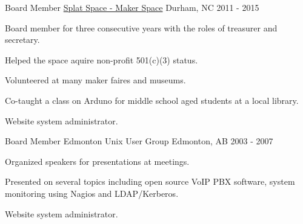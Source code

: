 

\begin{cventries}

  \cventry
    {Board Member} %
    {\href{http://splatspace.org/}{Splat Space - Maker Space}} %
    {Durham, NC} %
    {2011 - 2015} %
    {
      \begin{cvitems} %
        \item {Board member for three consecutive years with the roles of treasurer and secretary.}
        \item {Helped the space aquire non-profit 501(c)(3) status.}
        \item {Volunteered at many maker faires and museums.}
        \item {Co-taught a class on Arduno for middle school aged students at a local library.}
        \item {Website system administrator.}
      \end{cvitems}
    }

  \cventry
    {Board Member} %
    {Edmonton Unix User Group} %
    {Edmonton, AB} %
    {2003 - 2007} %
    {
      \begin{cvitems} %
        \item {Organized speakers for presentations at meetings.}
        \item {Presented on several topics including open source VoIP PBX software, system monitoring using Nagios and LDAP/Kerberos.}
        \item {Website system administrator.}
      \end{cvitems}
    }

\end{cventries}
